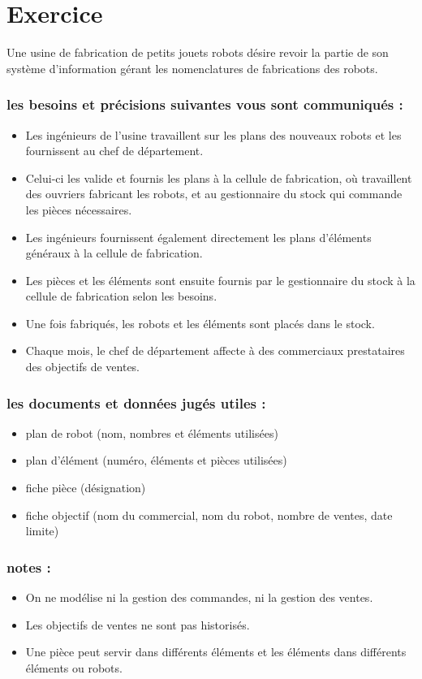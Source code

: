 \section*{Exercice}
Une usine de fabrication de petits jouets robots désire revoir la partie de son système d'information gérant les nomenclatures de fabrications des robots.

\subsubsection*{les besoins et précisions suivantes vous sont communiqués :}
\begin{itemize}
    \item Les ingénieurs de l'usine travaillent sur les plans des nouveaux robots et les fournissent au chef de département.
    \item Celui-ci les valide et fournis les plans à la cellule de fabrication, où travaillent des ouvriers fabricant les robots, et au gestionnaire du stock qui commande les pièces nécessaires.
    \item Les ingénieurs fournissent également directement les plans d'éléments généraux à la cellule de fabrication.
    \item Les pièces et les éléments sont ensuite fournis par le gestionnaire du stock à la cellule de fabrication selon les besoins.
    \item Une fois fabriqués, les robots et les éléments sont placés dans le stock.
    \item Chaque mois, le chef de département affecte à des commerciaux prestataires des objectifs de ventes.
\end{itemize}

\subsubsection*{les documents et données jugés utiles :}
\begin{itemize}
    \item plan de robot (nom, nombres et éléments utilisées)
    \item plan d'élément (numéro, éléments et pièces utilisées)
    \item fiche pièce (désignation)
    \item fiche objectif (nom du commercial, nom du robot, nombre de ventes, date limite)
\end{itemize}

\subsubsection*{notes :}
\begin{itemize}
    \item On ne modélise ni la gestion des commandes, ni la gestion des ventes.
    \item Les objectifs de ventes ne sont pas historisés.
    \item Une pièce peut servir dans différents éléments et les éléments dans différents éléments ou robots.
\end{itemize}
